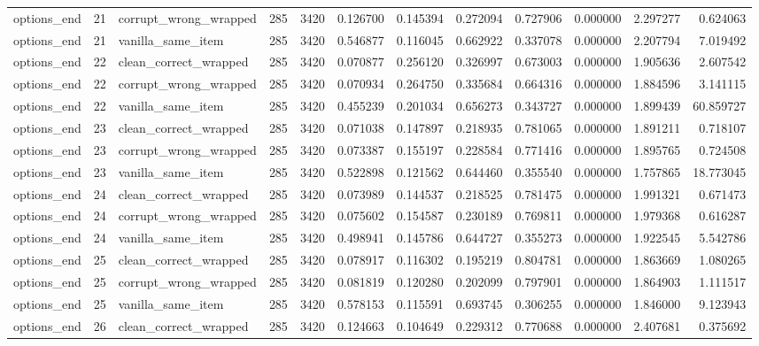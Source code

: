 \begin{tabular}{lrlrrrrrrrrr}
options\_end & 21 & corrupt\_wrong\_wrapped & 285 & 3420 & 0.126700 & 0.145394 & 0.272094 & 0.727906 & 0.000000 & 2.297277 & 0.624063 \\
options\_end & 21 & vanilla\_same\_item & 285 & 3420 & 0.546877 & 0.116045 & 0.662922 & 0.337078 & 0.000000 & 2.207794 & 7.019492 \\
options\_end & 22 & clean\_correct\_wrapped & 285 & 3420 & 0.070877 & 0.256120 & 0.326997 & 0.673003 & 0.000000 & 1.905636 & 2.607542 \\
options\_end & 22 & corrupt\_wrong\_wrapped & 285 & 3420 & 0.070934 & 0.264750 & 0.335684 & 0.664316 & 0.000000 & 1.884596 & 3.141115 \\
options\_end & 22 & vanilla\_same\_item & 285 & 3420 & 0.455239 & 0.201034 & 0.656273 & 0.343727 & 0.000000 & 1.899439 & 60.859727 \\
options\_end & 23 & clean\_correct\_wrapped & 285 & 3420 & 0.071038 & 0.147897 & 0.218935 & 0.781065 & 0.000000 & 1.891211 & 0.718107 \\
options\_end & 23 & corrupt\_wrong\_wrapped & 285 & 3420 & 0.073387 & 0.155197 & 0.228584 & 0.771416 & 0.000000 & 1.895765 & 0.724508 \\
options\_end & 23 & vanilla\_same\_item & 285 & 3420 & 0.522898 & 0.121562 & 0.644460 & 0.355540 & 0.000000 & 1.757865 & 18.773045 \\
options\_end & 24 & clean\_correct\_wrapped & 285 & 3420 & 0.073989 & 0.144537 & 0.218525 & 0.781475 & 0.000000 & 1.991321 & 0.671473 \\
options\_end & 24 & corrupt\_wrong\_wrapped & 285 & 3420 & 0.075602 & 0.154587 & 0.230189 & 0.769811 & 0.000000 & 1.979368 & 0.616287 \\
options\_end & 24 & vanilla\_same\_item & 285 & 3420 & 0.498941 & 0.145786 & 0.644727 & 0.355273 & 0.000000 & 1.922545 & 5.542786 \\
options\_end & 25 & clean\_correct\_wrapped & 285 & 3420 & 0.078917 & 0.116302 & 0.195219 & 0.804781 & 0.000000 & 1.863669 & 1.080265 \\
options\_end & 25 & corrupt\_wrong\_wrapped & 285 & 3420 & 0.081819 & 0.120280 & 0.202099 & 0.797901 & 0.000000 & 1.864903 & 1.111517 \\
options\_end & 25 & vanilla\_same\_item & 285 & 3420 & 0.578153 & 0.115591 & 0.693745 & 0.306255 & 0.000000 & 1.846000 & 9.123943 \\
options\_end & 26 & clean\_correct\_wrapped & 285 & 3420 & 0.124663 & 0.104649 & 0.229312 & 0.770688 & 0.000000 & 2.407681 & 0.375692 \\

\end{tabular}
